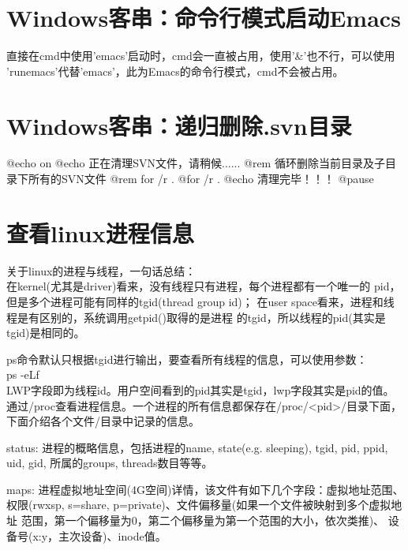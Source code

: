 ﻿\documentclass[a4paper,11pt]{article}
\begin{document}
  \section[Windows客串：命令行模式启动Emacs]{Windows客串：命令行模式启动Emacs}
  直接在cmd中使用'emacs'启动时，cmd会一直被占用，使用'\&'也不行，可以使用
  'runemacs'代替'emacs'，此为Emacs的命令行模式，cmd不会被占用。
  
  \section[Windows客串：递归删除.svn目录]{Windows客串：递归删除.svn目录}
  \begin{bashcode}
    @echo on
    @echo 正在清理SVN文件，请稍候......
    @rem 循环删除当前目录及子目录下所有的SVN文件
    @rem for /r . %
    @for /r . %
    @echo 清理完毕！！！
    @pause
  \end{bashcode}


  \section[查看linux进程信息]{查看linux进程信息}
  关于linux的进程与线程，一句话总结：\\
  在kernel(尤其是driver)看来，没有线程只有进程，每个进程都有一个唯一的
  pid，但是多个进程可能有同样的tgid(thread group id)；
  在user space看来，进程和线程是有区别的，系统调用getpid()取得的是进程
  的tgid，所以线程的pid(其实是tgid)是相同的。

  ps命令默认只根据tgid进行输出，要查看所有线程的信息，可以使用参数：\\
  ps -eLf\\
  LWP字段即为线程id。用户空间看到的pid其实是tgid，lwp字段其实是pid的值。\\[10pt]

  通过/proc查看进程信息。一个进程的所有信息都保存在/proc/<pid>/目录下面，
  下面介绍各个文件/目录中记录的信息。

  status: 进程的概略信息，包括进程的name, state(e.g. sleeping), tgid, pid, ppid,
  uid, gid, 所属的groups, threads数目等等。

  maps: 进程虚拟地址空间(4G空间)详情，该文件有如下几个字段：虚拟地址范围、
  权限(rwxsp, s=share, p=private)、文件偏移量(如果一个文件被映射到多个虚拟地址
  范围，第一个偏移量为0，第二个偏移量为第一个范围的大小，依次类推)、
  设备号(x:y，主次设备)、inode值。
\end{document}
